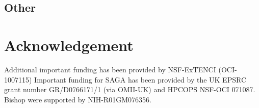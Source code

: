 \documentclass{sig-alternate}
\begin{document}
\subsection{Other}



\section*{Acknowledgement}
\footnotesize{Additional important
  funding has been provided by NSF-ExTENCI (OCI-1007115) Important
  funding for SAGA has been provided by the UK EPSRC grant number
  GR/D0766171/1 (via OMII-UK) and HPCOPS NSF-OCI 071087. Bishop were
  supported by NIH-R01GM076356.}


%
%
\end{document}
